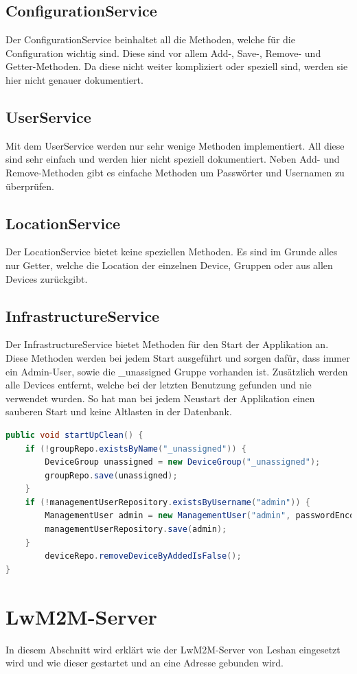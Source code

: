 \subsection{ConfigurationService}
Der ConfigurationService beinhaltet all die Methoden, welche für die Configuration wichtig sind. Diese sind vor allem Add-, Save-, Remove- und Getter-Methoden. Da diese nicht weiter kompliziert oder speziell sind, werden sie hier nicht genauer dokumentiert.
\subsection{UserService}
Mit dem UserService werden nur sehr wenige Methoden implementiert. All diese sind sehr einfach und werden hier nicht speziell dokumentiert. Neben Add- und Remove-Methoden gibt es einfache Methoden um Passwörter und Usernamen zu überprüfen.
\subsection{LocationService}
Der LocationService bietet keine speziellen Methoden. Es sind im Grunde alles nur Getter, welche die Location der einzelnen Device, Gruppen oder aus allen Devices zurückgibt.
\subsection{InfrastructureService}
Der InfrastructureService bietet Methoden für den Start der Applikation an. Diese Methoden werden bei jedem Start ausgeführt und sorgen dafür, dass immer ein Admin-User, sowie die \_unassigned Gruppe vorhanden ist. Zusätzlich werden alle Devices entfernt, welche bei der letzten Benutzung gefunden und nie verwendet wurden. So hat man bei jedem Neustart der Applikation einen sauberen Start und keine Altlasten in der Datenbank.
\begin{lstlisting}[language=java]
public void startUpClean() {
	if (!groupRepo.existsByName("_unassigned")) {
		DeviceGroup unassigned = new DeviceGroup("_unassigned");
		groupRepo.save(unassigned);
	}
	if (!managementUserRepository.existsByUsername("admin")) {
		ManagementUser admin = new ManagementUser("admin", passwordEncoder.encode("adminadmin"));
		managementUserRepository.save(admin);
	}
		deviceRepo.removeDeviceByAddedIsFalse();
}
\end{lstlisting}


\newpage

\section{LwM2M-Server}
In diesem Abschnitt wird erklärt wie der LwM2M-Server von Leshan eingesetzt wird und wie dieser gestartet und an eine Adresse gebunden wird. 

